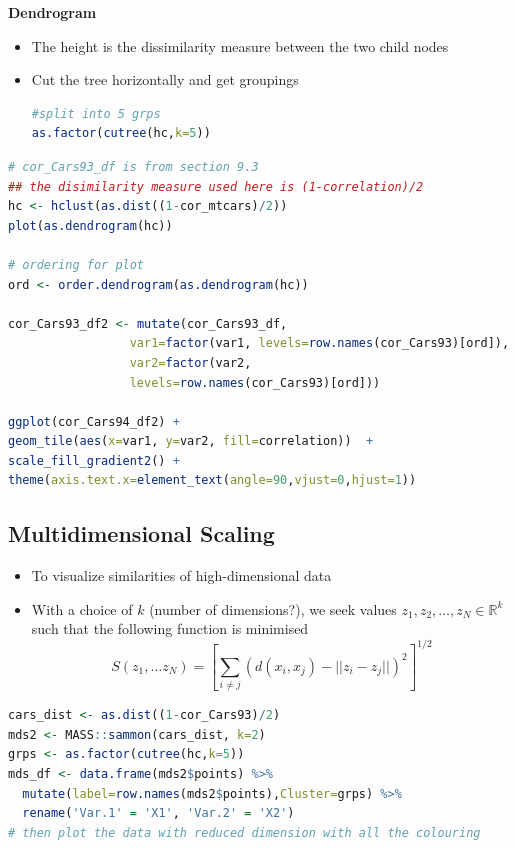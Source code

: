 \documentclass{article}
\begin{document}
\begin{multicols}{2}
\begin{enumerate}
\end{enumerate}
\textbf{Dendrogram}
\begin{itemize}
	\item The height is the dissimilarity measure between the two child nodes
	\item Cut the tree horizontally and get groupings
	\begin{lstlisting}[language=R]
#split into 5 grps
as.factor(cutree(hc,k=5))
\end{lstlisting}
\end{itemize}
\begin{lstlisting}[language=R]
# cor_Cars93_df is from section 9.3
## the disimilarity measure used here is (1-correlation)/2
hc <- hclust(as.dist((1-cor_mtcars)/2))
plot(as.dendrogram(hc))

# ordering for plot
ord <- order.dendrogram(as.dendrogram(hc))

cor_Cars93_df2 <- mutate(cor_Cars93_df,
                 var1=factor(var1, levels=row.names(cor_Cars93)[ord]),
                 var2=factor(var2,
                 levels=row.names(cor_Cars93)[ord]))

ggplot(cor_Cars94_df2) +
geom_tile(aes(x=var1, y=var2, fill=correlation))  +
scale_fill_gradient2() +
theme(axis.text.x=element_text(angle=90,vjust=0,hjust=1))
\end{lstlisting}
\subsection{Multidimensional Scaling}
\begin{itemize}
	\item To visualize similarities of high-dimensional data
	\item With a choice of $k$ (number of dimensions?), we seek values $z_1,z_2,\dots,z_N\in\mathbb{R}^k$ such that the following function is minimised
	$$S(z_1,\dots z_N) = \left[\sum_{i\neq j}(d(x_i,x_j)-||z_i-z_j||)^2\right]^{1/2}$$
\end{itemize}
\begin{lstlisting}[language=R]
cars_dist <- as.dist((1-cor_Cars93)/2)
mds2 <- MASS::sammon(cars_dist, k=2)
grps <- as.factor(cutree(hc,k=5))
mds_df <- data.frame(mds2$points) %>%
  mutate(label=row.names(mds2$points),Cluster=grps) %>%
  rename('Var.1' = 'X1', 'Var.2' = 'X2')
# then plot the data with reduced dimension with all the colouring
\end{lstlisting}


\end{multicols}
\end{document}
